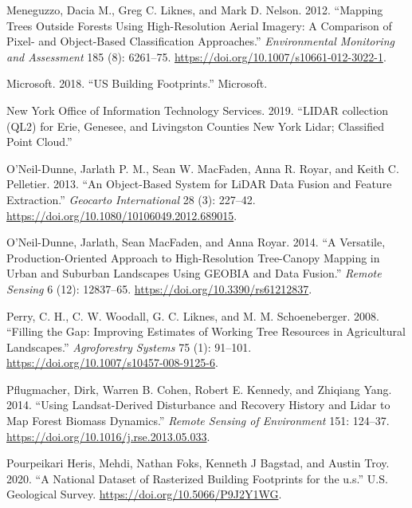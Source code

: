 \documentclass[review]{elsarticle} %
\newlength{\cslhangindent}
\newenvironment{CSLReferences}[2] %
 {%
  \setlength{\parindent}{0pt}
  \ifodd #1 \everypar{\setlength{\hangindent}{\cslhangindent}}\ignorespaces\fi
  \ifnum #2 > 0
  \setlength{\parskip}{#2\baselineskip}
  \fi
 }%
 {}
\begin{document}
\begin{CSLReferences}{1}{0}
\leavevmode{}%
Meneguzzo, Dacia M., Greg C. Liknes, and Mark D. Nelson. 2012. {``Mapping Trees Outside Forests Using High-Resolution Aerial Imagery: A Comparison of Pixel- and Object-Based Classification Approaches.''} \emph{Environmental Monitoring and Assessment} 185 (8): 6261--75. \url{https://doi.org/10.1007/s10661-012-3022-1}.

\leavevmode{}%
Microsoft. 2018. {``{US Building Footprints.}''} Microsoft.

\leavevmode{}%
New York Office of Information Technology Services. 2019. {``{LIDAR collection (QL2) for Erie, Genesee, and Livingston Counties New York Lidar; Classified Point Cloud}.''}

\leavevmode{}%
O'Neil-Dunne, Jarlath P. M., Sean W. MacFaden, Anna R. Royar, and Keith C. Pelletier. 2013. {``An Object-Based System for LiDAR Data Fusion and Feature Extraction.''} \emph{Geocarto International} 28 (3): 227--42. \url{https://doi.org/10.1080/10106049.2012.689015}.

\leavevmode{}%
O'Neil-Dunne, Jarlath, Sean MacFaden, and Anna Royar. 2014. {``A Versatile, Production-Oriented Approach to High-Resolution Tree-Canopy Mapping in Urban and Suburban Landscapes Using GEOBIA and Data Fusion.''} \emph{Remote Sensing} 6 (12): 12837--65. \url{https://doi.org/10.3390/rs61212837}.

\leavevmode{}%
Perry, C. H., C. W. Woodall, G. C. Liknes, and M. M. Schoeneberger. 2008. {``Filling the Gap: Improving Estimates of Working Tree Resources in Agricultural Landscapes.''} \emph{Agroforestry Systems} 75 (1): 91--101. \url{https://doi.org/10.1007/s10457-008-9125-6}.

\leavevmode{}%
Pflugmacher, Dirk, Warren B. Cohen, Robert E. Kennedy, and Zhiqiang Yang. 2014. {``Using Landsat-Derived Disturbance and Recovery History and Lidar to Map Forest Biomass Dynamics.''} \emph{Remote Sensing of Environment} 151: 124--37. \url{https://doi.org/10.1016/j.rse.2013.05.033}.

\leavevmode{}%
Pourpeikari Heris, Mehdi, Nathan Foks, Kenneth J Bagstad, and Austin Troy. 2020. {``A National Dataset of Rasterized Building Footprints for the u.s.''} U.S. Geological Survey. \url{https://doi.org/10.5066/P9J2Y1WG}.


\end{CSLReferences}
\end{document}
